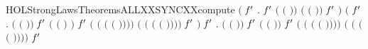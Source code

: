\begin{SaveVerbatim}{HOLStrongLawsTheoremsALLXXSYNCXXcompute}
\HOLTokenTurnstile{} \ensuremath{(}\HOLSymConst{\HOLTokenForall{}} \ensuremath{\HOLBoundVar{f}\sp{\prime{}}} .
         \ensuremath{\HOLBoundVar{f}\sp{\prime{}}}  \HOLSymConst{\ensuremath{=}}
       \ensuremath{(} \ensuremath{(} \ensuremath{)}\ensuremath{)} \ensuremath{(} \ensuremath{(} \ensuremath{)}\ensuremath{)} \ensuremath{\HOLBoundVar{f}\sp{\prime{}}} \ensuremath{)} \HOLSymConst{\HOLTokenConj{}}
   \ensuremath{(}\HOLSymConst{\HOLTokenForall{}}  \ensuremath{\HOLBoundVar{f}\sp{\prime{}}} .
        \ensuremath{(} \ensuremath{(} \ensuremath{)}\ensuremath{)} \ensuremath{\HOLBoundVar{f}\sp{\prime{}}}  \HOLSymConst{\ensuremath{=}}
        \ensuremath{(} \ensuremath{(} \ensuremath{)} \HOLSymConst{\ensuremath{-}} \ensuremath{)} \ensuremath{\HOLBoundVar{f}\sp{\prime{}}}  \HOLSymConst{\ensuremath{+}}
       \ensuremath{(} \ensuremath{(} \ensuremath{(} \ensuremath{(} \ensuremath{)}\ensuremath{)}\ensuremath{)}\ensuremath{)}
        \ensuremath{(} \ensuremath{(} \ensuremath{(} \ensuremath{(} \ensuremath{)}\ensuremath{)}\ensuremath{)}\ensuremath{)} \ensuremath{\HOLBoundVar{f}\sp{\prime{}}} \ensuremath{)} \HOLSymConst{\HOLTokenConj{}}
   \HOLSymConst{\HOLTokenForall{}}  \ensuremath{\HOLBoundVar{f}\sp{\prime{}}} .
       \ensuremath{(} \ensuremath{(} \ensuremath{)}\ensuremath{)} \ensuremath{\HOLBoundVar{f}\sp{\prime{}}}  \HOLSymConst{\ensuremath{=}}
       \ensuremath{(} \ensuremath{(} \ensuremath{)}\ensuremath{)} \ensuremath{\HOLBoundVar{f}\sp{\prime{}}}  \HOLSymConst{\ensuremath{+}}
      \ensuremath{(} \ensuremath{(} \ensuremath{(} \ensuremath{(} \ensuremath{)}\ensuremath{)}\ensuremath{)}\ensuremath{)}
       \ensuremath{(} \ensuremath{(} \ensuremath{(} \ensuremath{(} \ensuremath{)}\ensuremath{)}\ensuremath{)}\ensuremath{)} \ensuremath{\HOLBoundVar{f}\sp{\prime{}}} 
\end{SaveVerbatim}
